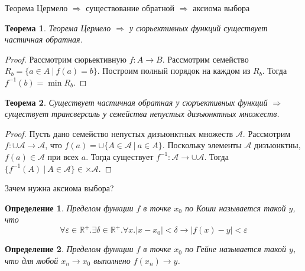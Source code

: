 \documentclass[aspectratio=169]{beamer}
\newtheorem{thm}{Теорема}[section]
\newtheorem{dfn}{Определение}[section]
\begin{document}
\begin{frame}{Теорема Цермело $\Rightarrow$ существование обратной $\Rightarrow$ аксиома выбора}
\begin{thm}Теорема Цермело $\Rightarrow$ у сюрьективных функций существует частичная обратная.\end{thm}
\begin{proof}
Рассмотрим сюрьективную $f: A \rightarrow B$. Рассмотрим семейство $R_b = \{ a \in A\ |\ f(a) = b \}$.
Построим полный порядок на каждом из $R_b$. Тогда $f^{-1}(b) = \min R_b$.
\end{proof}
\begin{thm}Существует частичная обратная у сюръективных функций $\Rightarrow$ существует трансверсаль у семейства непустых дизъюнктных множеств.\end{thm}
\begin{proof}
Пусть дано семейство непустых дизъюнктных множеств $\mathcal{A}$. 
Рассмотрим $f: \cup \mathcal{A} \rightarrow \mathcal{A}$, что
$f(a) = \cup\{ A \in \mathcal{A}\ |\ a \in A \}$. Поскольку элементы $\mathcal{A}$ дизъюнктны,
$f(a) \in \mathcal{A}$ при всех $a$. Тогда существует $f^{-1}: \mathcal{A} \rightarrow \cup\mathcal{A}$. Тогда 
$\{ f^{-1}(A)\ |\ A\in\mathcal{A} \} \in \times \mathcal{A}$.
\end{proof}
\end{frame}

\begin{frame}{Зачем нужна аксиома выбора?}
\begin{dfn}Пределом функции $f$ в точке $x_0$ по \emph{Коши} называется такой $y$, что
$$\forall \varepsilon\in\mathbb{R}^+.\exists \delta\in\mathbb{R}^+.\forall x.|x-x_0| < \delta \rightarrow |f(x) - y| < \varepsilon$$
\end{dfn}

\vspace{-0.5cm}
\begin{dfn}Пределом функции $f$ в точке $x_0$ по \emph{Гейне} называется такой $y$, что
для любой $x_n \rightarrow x_0$ выполнено $f(x_n) \rightarrow y$.
\end{dfn}
\end{frame}
\end{document}
